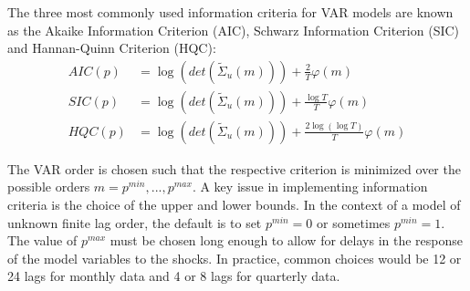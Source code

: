\documentclass[a4paper]{scrartcl}
\begin{document}
    The three most commonly used information criteria for VAR models are known as the Akaike Information Criterion (AIC), Schwarz Information Criterion (SIC) and Hannan-Quinn Criterion (HQC):
    \begin{align*}
        AIC(p) & = \log(det(\tilde{\Sigma}_u(m))) + \frac{2}{T}\varphi(m)              \\
        SIC(p) & = \log(det(\tilde{\Sigma}_u(m))) + \frac{\log T}{T}\varphi(m)         \\
        HQC(p) & = \log(det(\tilde{\Sigma}_u(m))) + \frac{2\log (\log T)}{T}\varphi(m)
    \end{align*}
    
    The VAR order is chosen such that the respective criterion is minimized over the possible orders $m = p^{min},...,p^{max}$. A key issue in implementing information criteria is the choice of the upper and lower bounds. In the context of a model of unknown finite lag order, the default is to set $p^{min}=0$ or sometimes $p^{min} = 1$. The value of $p^{max}$ must be chosen long enough to allow for delays in the response of the model variables to the shocks. In practice, common choices would be 12 or 24 lags for monthly data and 4 or 8 lags for quarterly data.
\end{document}
